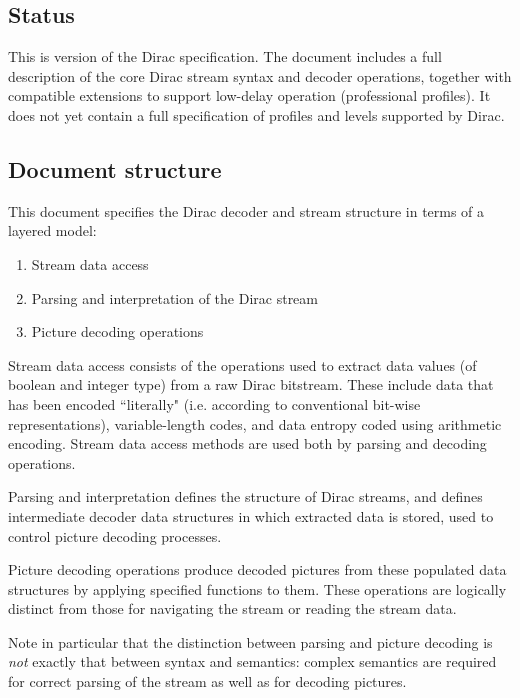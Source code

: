 \subsection{Status}
\label{introstatus}

This is version \SpecVersion of the Dirac specification. The document includes
a full description of the core Dirac stream syntax and decoder operations, together
with compatible extensions to support low-delay operation (professional profiles). It does
not yet contain a full specification of profiles and levels supported by Dirac.

\subsection{Document structure}
\label{introdocstruct}

This document specifies the Dirac decoder and stream structure in terms of
a layered model:

\begin{enumerate}
    \item Stream data access
    \item Parsing and interpretation of the Dirac stream
    \item Picture decoding operations
\end{enumerate}

Stream data access consists of the operations used to extract data values
(of boolean and integer type) from a raw Dirac bitstream. These include
data that has been encoded ``literally" (i.e. according to conventional bit-wise
representations), variable-length codes, and data entropy coded using arithmetic
encoding. Stream data access methods are used both by parsing and decoding operations.

Parsing and interpretation defines the structure of Dirac streams, and defines
intermediate decoder data structures in which extracted data is stored, 
used to control picture decoding processes.

Picture decoding operations produce decoded pictures from these populated
data structures by applying specified functions to them. These operations
are logically distinct from those for navigating the stream or reading the stream data.

Note in particular that the distinction between parsing and picture decoding is
{\em not} exactly that between syntax and semantics: complex semantics are
required for correct parsing of the stream as well as for decoding pictures. 

